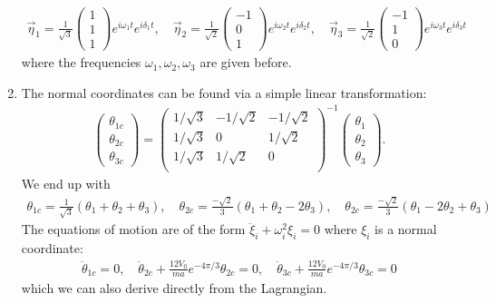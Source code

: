 \documentclass{article}
\theoremstyle{definition}
\newcommand{\f}[2]{\frac{#1}{#2}}
\begin{document}
\begin{enumerate}[label=(\alph*)]
	\begin{align*}
	\boxed{\vec{\eta}_1 = \f{1}{\sqrt{3}}\begin{pmatrix}
	1\\1\\1
	\end{pmatrix}e^{i\omega_1 t}e^{i\delta_1 t}, \quad \vec{\eta}_2= \f{1}{\sqrt{2}}\begin{pmatrix}
	-1\\0\\1
	\end{pmatrix}e^{i\omega_2 t} e^{i\delta_2 t}, 
	\quad \vec{\eta}_3 = \f{1}{\sqrt{2}}\begin{pmatrix}
	-1\\1\\0
	\end{pmatrix}e^{i\omega_3 t} e^{i\delta_3 t}} 
	\end{align*}
	where the frequencies $\omega_1,\omega_2,\omega_3$ are given before.
	
	\item The normal coordinates can be found via a simple linear transformation:
	\begin{align*}
	\begin{pmatrix}
	\theta_{1c} \\ \theta_{2c} \\ \theta_{3c}
	\end{pmatrix}
	= 
	\begin{pmatrix}
	1/\sqrt{3} & -1/\sqrt{2} & -1/\sqrt{2} \\
	1/\sqrt{3} & 0 & 1/\sqrt{2} \\
	1/\sqrt{3} & 1/\sqrt{2} & 0 \\
	\end{pmatrix}^{-1}
	\begin{pmatrix}
	\theta_1\\ \theta_2 \\ \theta_3 
	\end{pmatrix}.
	\end{align*}
	We end up with
	\begin{align*}
	\boxed{\theta_{1c} = \f{1}{\sqrt{3}}(\theta_1+\theta_2 + \theta_3), \quad \theta_{2c}= \f{-\sqrt{2}}{3}(\theta_1+\theta_2 - 2\theta_3), \quad \theta_{2c}= \f{-\sqrt{2}}{3}(\theta_1- 2\theta_2 +\theta_3)}
	\end{align*}
	The equations of motion are of the form $\ddot \xi_i + \omega^2_i \xi_i = 0$ where $\xi_i$ is a normal coordinate:
	\begin{align*}
	\boxed{\ddot\theta_{1c} = 0, \quad \ddot\theta_{2c} + \f{12V_0}{ma}e^{-4\pi/3} \theta_{2c} = 0, \quad 
	\ddot\theta_{3c} + \f{12V_0}{ma}e^{-4\pi/3} \theta_{3c} = 0}
	\end{align*}
	which we can also derive directly from the Lagrangian.
	

\end{enumerate}
\end{document}
